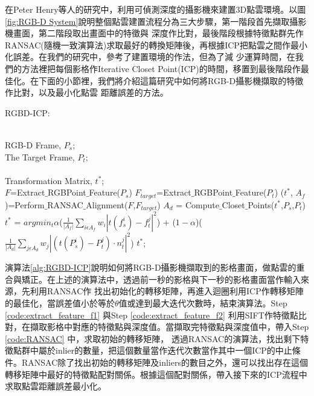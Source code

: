 	 在Peter Henry等人\cite{Henry2012}的研究中，利用可偵測深度的攝影機來建置3D點雲環境。以圖\ref{fig:RGB-D System}說明整個點雲建置流程分為三大步驟，第一階段首先擷取攝影機畫面，第二階段取出畫面中的特徵與
深度作比對，最後階段根據特徵點群先作RANSAC(隨機一致演算法)求取最好的轉換矩陣後，再根據ICP把點雲之間作最小化誤差。在我們的研究中，參考了\cite{Henry2012}建置環境的作法，但為了減
少運算時間，在我們的方法裡把每個影格作Iterative Closet Point(ICP)的時間，移置到最後階段作最佳化。在下面的小節裡，我們將介紹這篇研究中如何將RGB-D攝影機擷取的特徵作比對，以及最小化點雲
距離誤差的方法。

\begin{algorithm}[htb] 
\renewcommand{\algorithmicrequire}{\textbf{Input:}}
\renewcommand\algorithmicensure {\textbf{Output:} }
\caption{ RGBD-ICP: } %
	\label{alg:RGBD-ICP} %
	\begin{algorithmic}[1] %
	\REQUIRE ~~\\ %
	RGB-D Frame, $P_s$;\\
	The Target Frame, $P_t$;\\
	\ENSURE ~~\\ %
	Transformation Matrix, $t^*$;\\

	\STATE $F$=Extract$\_$RGBPoint$\_$Feature($P_s$) \label{code:extract_feature_f1} 
	\STATE $F_{target}$=Extract$\_$RGBPoint$\_$Feature($P_t$) \label{code:extract_feature_f2}
	\STATE ($t^*$, $A_f$)=Perform$\_$RANSAC$\_$Alignment($F$,$F_{target}$) \label{code:RANSAC}
	\REPEAT \label{code:into while}
		\STATE $A_d$ = Compute$\_$Closet$\_$Points($t^*$,$P_s$,$P_t$) \label{code:Compute ICP}
		\STATE $t^*$ = $argmin_t \alpha$($\frac{1}{|A_f|}\sum_{i \epsilon A_f} w_i|t(f_s^i)-f_t^j|^2$) + ($1-\alpha$)($\frac{1}{|A_d|}\sum_{j \epsilon A_d} w_j|(t(P_s^i)-P_t^j)\cdot n_t^j|^2$) \label{code:Compute Minimal Distance Error}
	 \label{code:Exit While}
	\RETURN $t^*$; %
\end{algorithmic}
\end{algorithm}

	演算法\ref{alg:RGBD-ICP}說明如何將RGB-D攝影機擷取到的影格畫面，做點雲的重合與矯正。在上述的演算法中，透過前一秒的影格與下一秒的影格畫面當作輸入來源，先利用RANSAC作
找出初始化的轉移矩陣，再進入迴圈利用ICP作轉移矩陣的最佳化，當誤差值小於等於$\theta$值或達到最大迭代次數時，結束演算法。Step \ref{code:extract_feature_f1} 與Step \ref{code:extract_feature_f2} 利用SIFT作特徵點比對，在擷取影格中對應的特徵點與深度值。當擷取完特徵點與深度值中，帶入Step \ref{code:RANSAC} 中，求取初始的轉移矩陣，
透過RANSAC的演算法，找出剩下特徵點群中屬於inlier的數量，把這個數量當作迭代次數當作其中一個ICP的中止條件。RANSAC除了找出初始的轉移矩陣及inliers的數目之外，還可以找出存在這個
轉移矩陣中最好的特徵點配對關係。根據這個配對關係，帶入接下來的ICP流程中求取點雲距離誤差最小化。
	

